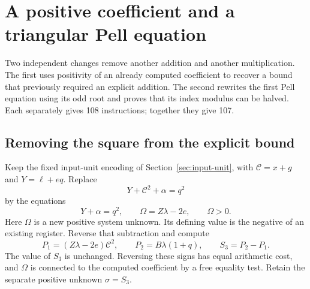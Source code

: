 \section{A positive coefficient and a triangular Pell equation}
\label{sec:final-two-savings}

Two independent changes remove another addition and another multiplication.
The first uses positivity of an already computed coefficient to recover
a bound that previously required an explicit addition. The second
rewrites the first Pell equation using its odd root and proves that
its index modulus can be halved. Each separately gives 108 instructions;
together they give 107.

\subsection{Removing the square from the explicit bound}

Keep the fixed input-unit encoding of Section~\ref{sec:input-unit},
with $\mathcal C=x+g$ and $Y=\ell+eq$. Replace
\[
 Y+\mathcal C^2+\alpha=q^2
\]
by the equations
\begin{equation}\label{eq:positive-coefficient-bound}
 Y+\alpha=q^2,\qquad \Omega=Z\lambda-2e,
 \qquad \Omega>0.
\end{equation}
Here $\Omega$ is a new positive system unknown. Its defining value
is the negative of an existing register. Reverse that subtraction and
compute
\[
 P_1=(Z\lambda-2e)\mathcal C^2,
 \qquad P_2=B\lambda(1+q),\qquad S_3=P_2-P_1.
\]
The value of $S_3$ is unchanged. Reversing these signs has equal
arithmetic cost, and $\Omega$ is connected to the computed coefficient
by a free equality test. Retain the separate positive unknown
$\sigma=S_3$.

